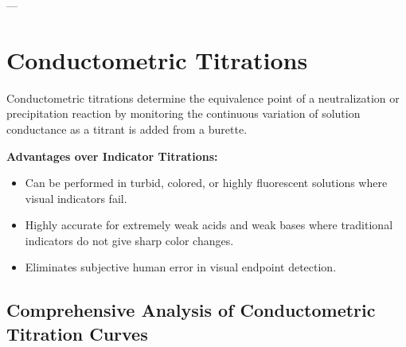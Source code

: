 ---

\section{Conductometric Titrations}

Conductometric titrations determine the equivalence point of a neutralization or precipitation reaction by monitoring the continuous variation of solution conductance as a titrant is added from a burette.

\textbf{Advantages over Indicator Titrations:}
\begin{itemize}[leftmargin=*]
    \item Can be performed in turbid, colored, or highly fluorescent solutions where visual indicators fail.
    \item Highly accurate for extremely weak acids and weak bases where traditional indicators do not give sharp color changes.
    \item Eliminates subjective human error in visual endpoint detection.
\end{itemize}

\subsection{Comprehensive Analysis of Conductometric Titration Curves}

